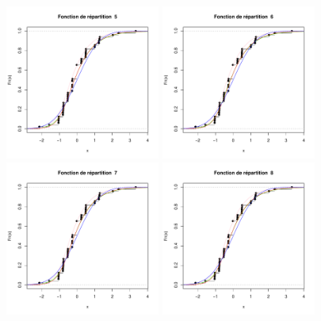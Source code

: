 \documentclass{report}
\begin{document}
\begin{Schunk}
\includegraphics[height=2in,width=2in]{dist-GAL-5.pdf}
\includegraphics[height=2in,width=2in]{dist-GAL-6.pdf}
\includegraphics[height=2in,width=2in]{dist-GAL-7.pdf}
\includegraphics[height=2in,width=2in]{dist-GAL-8.pdf}\end{Schunk}
\end{document}
